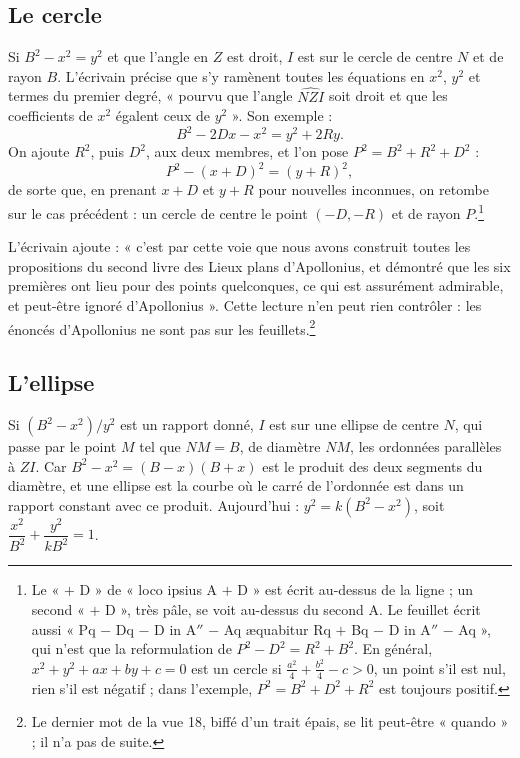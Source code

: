 \documentclass[11pt,a4paper]{article}
\begin{document}
\subsection*{Le cercle}

Si $B^2 - x^2 = y^2$ et que l'angle en $Z$ est droit, $I$ est sur le cercle de
centre $N$ et de rayon $B$. L'écrivain précise que s'y ramènent toutes les
équations en $x^2$, $y^2$ et termes du premier degré, « pourvu que l'angle
$\widehat{NZI}$ soit droit et que les coefficients de $x^2$ égalent ceux de
$y^2$ ». Son exemple :
\[ B^2 - 2Dx - x^2 = y^2 + 2Ry . \]
On ajoute $R^2$, puis $D^2$, aux deux membres, et l'on pose
$P^2 = B^2 + R^2 + D^2$ :
\[ P^2 - (x + D)^2 = (y + R)^2 , \]
de sorte que, en prenant $x + D$ et $y + R$ pour nouvelles inconnues, on
retombe sur le cas précédent : un cercle de centre le point $(-D, -R)$ et de
rayon $P$.\footnote{Le « $+$ D » de « loco ipsius A $+$ D » est écrit
au-dessus de la ligne ; un second « $+$ D », très pâle, se voit au-dessus du
second A. Le feuillet écrit aussi « Pq $-$ Dq $-$ D in A$''$ $-$ Aq æquabitur
Rq $+$ Bq $-$ D in A$''$ $-$ Aq », qui n'est que la reformulation de
$P^2 - D^2 = R^2 + B^2$. En général, $x^2 + y^2 + ax + by + c = 0$ est un
cercle si $\tfrac{a^2}{4} + \tfrac{b^2}{4} - c > 0$, un point s'il est nul, rien
s'il est négatif ; dans l'exemple, $P^2 = B^2 + D^2 + R^2$ est toujours
positif.}

L'écrivain ajoute : « c'est par cette voie que nous avons construit toutes les
propositions du second livre des Lieux plans d'Apollonius, et démontré que les
six premières ont lieu pour des points quelconques, ce qui est assurément
admirable, et peut-être ignoré d'Apollonius ». Cette lecture n'en peut rien
contrôler : les énoncés d'Apollonius ne sont pas sur les feuillets.\footnote{Le
dernier mot de la vue 18, biffé d'un trait épais, se lit peut-être
« quando » ; il n'a pas de suite.}

\subsection*{L'ellipse}

Si $(B^2 - x^2)/y^2$ est un rapport donné, $I$ est sur une ellipse de centre
$N$, qui passe par le point $M$ tel que $NM = B$, de diamètre $NM$, les
ordonnées parallèles à $ZI$. Car $B^2 - x^2 = (B - x)(B + x)$ est le produit
des deux segments du diamètre, et une ellipse est la courbe où le carré de
l'ordonnée est dans un rapport constant avec ce produit. Aujourd'hui :
$y^2 = k(B^2 - x^2)$, soit $\dfrac{x^2}{B^2} + \dfrac{y^2}{kB^2} = 1$.
\end{document}
